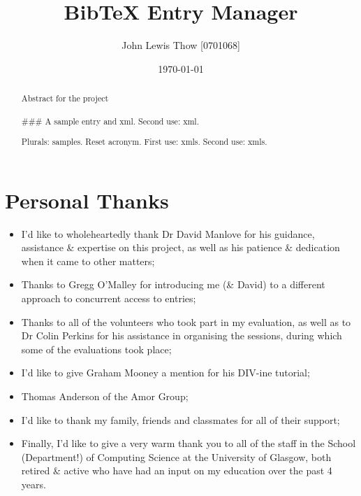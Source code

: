 \documentclass{l4proj}
\newcommand{\BibTeX}{B{\sc ib}\TeX}
\newcommand{\bibtex}{\BibTeX}
\newcommand{\revisit}{\#\#\#}
\begin{document}
\title{\bibtex{} Entry Manager}
\author{John Lewis Thow [0701068]}
\date{\today}
\maketitle




\begin{abstract}
Abstract for the project\\\\

\revisit
A \gls{sample} entry and \gls{xml}. Second use: \gls{xml}.

Plurals: \glspl{sample}. Reset acronym.
First use: \glspl{xml}. Second use: \glspl{xml}.

\end{abstract}


\newpage
\section*{Personal Thanks}
\begin{itemize}
\item I'd like to wholeheartedly thank Dr David Manlove for his guidance, assistance \& expertise on this project, as well as his patience \& dedication when it came to other matters;
\item Thanks to Gregg O'Malley for introducing me (\& David) to a different approach to concurrent access to entries;
\item Thanks to all of the volunteers who took part in my evaluation, as well as to Dr Colin Perkins for his assistance in organising the sessions, during which some of the evaluations took place;
\item I'd like to give Graham Mooney a mention for his DIV-ine tutorial;
\item Thomas Anderson of the Amor Group;
\item I'd like to thank my family, friends and classmates for all of their support;
\item Finally, I'd like to give a very warm thank you to all of the staff in the School (Department!) of Computing Science at the University of Glasgow, both retired \& active who have had an input on my education over the past 4 years.
\end{itemize}
\end{document}
